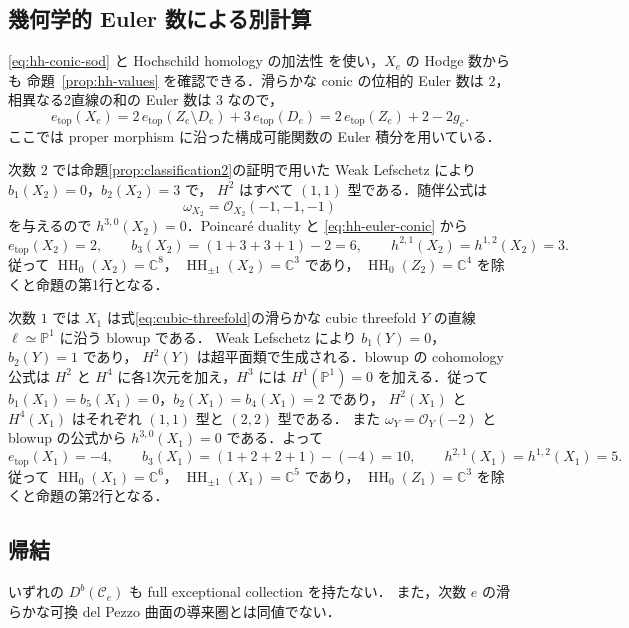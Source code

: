 \subsection{幾何学的 Euler 数による別計算}

\eqref{eq:hh-conic-sod} と Hochschild homology の加法性
\cite[Corollary~7.5]{KuznetsovHH} を使い，$X_e$ の Hodge 数からも
命題~\ref{prop:hh-values} を確認できる．滑らかな conic の位相的 Euler 数は
$2$，相異なる2直線の和の Euler 数は $3$ なので，
\begin{equation}
 e_{\mathrm{top}}(X_e)
 =2\,e_{\mathrm{top}}(Z_e\setminus D_e)+3\,e_{\mathrm{top}}(D_e)
 =2\,e_{\mathrm{top}}(Z_e)+2-2g_e.
 \label{eq:hh-euler-conic}
\end{equation}
ここでは proper morphism に沿った構成可能関数の Euler 積分を用いている．

次数 $2$ では命題\ref{prop:classification2}の証明で用いた
Weak Lefschetz により $b_1(X_2)=0$，$b_2(X_2)=3$ で，
$H^2$ はすべて $(1,1)$ 型である．随伴公式は
\[
 \omega_{X_2}=\mathcal O_{X_2}(-1,-1,-1)
\]
を与えるので $h^{3,0}(X_2)=0$．Poincar\'e duality と
\eqref{eq:hh-euler-conic} から
\[
 e_{\mathrm{top}}(X_2)=2,\qquad
 b_3(X_2)=(1+3+3+1)-2=6,
 \qquad h^{2,1}(X_2)=h^{1,2}(X_2)=3.
\]
従って $\operatorname{HH}_0(X_2)=\mathbb C^8$，
$\operatorname{HH}_{\pm1}(X_2)=\mathbb C^3$ であり，
$\operatorname{HH}_0(Z_2)=\mathbb C^4$ を除くと命題の第1行となる．

次数 $1$ では $X_1$ は式\eqref{eq:cubic-threefold}の滑らかな cubic threefold $Y$ の直線
$\ell\simeq\mathbb P^1$ に沿う blowup である．
Weak Lefschetz により $b_1(Y)=0$，$b_2(Y)=1$ であり，
$H^2(Y)$ は超平面類で生成される．blowup の cohomology 公式は
$H^2$ と $H^4$ に各1次元を加え，$H^3$ には
$H^1(\mathbb P^1)=0$ を加える．従って
$b_1(X_1)=b_5(X_1)=0$，$b_2(X_1)=b_4(X_1)=2$ であり，
$H^2(X_1)$ と $H^4(X_1)$ はそれぞれ $(1,1)$ 型と $(2,2)$ 型である．
また $\omega_Y=\mathcal O_Y(-2)$ と blowup の公式から
$h^{3,0}(X_1)=0$ である．よって
\[
 e_{\mathrm{top}}(X_1)=-4,\qquad
 b_3(X_1)=(1+2+2+1)-(-4)=10,
 \qquad h^{2,1}(X_1)=h^{1,2}(X_1)=5.
\]
従って $\operatorname{HH}_0(X_1)=\mathbb C^6$，
$\operatorname{HH}_{\pm1}(X_1)=\mathbb C^5$ であり，
$\operatorname{HH}_0(Z_1)=\mathbb C^3$ を除くと命題の第2行となる．

\subsection{帰結}

\begin{corollary}
いずれの $D^b(\mathcal C_e)$ も full exceptional collection を持たない．
また，次数 $e$ の滑らかな可換 del Pezzo 曲面の導来圏とは同値でない．
\end{corollary}

